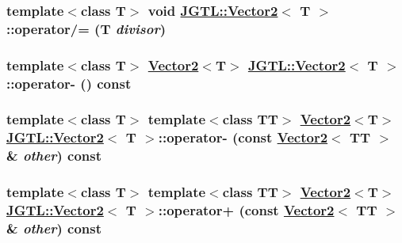\hypertarget{class_j_g_t_l_1_1_vector2_2cc09a9baa2ae84426f750ed2d50be0e}{
\subsubsection[operator/=]{\setlength{\rightskip}{0pt plus 5cm}template$<$class T$>$ void \hyperlink{class_j_g_t_l_1_1_vector2}{JGTL::Vector2}$<$ T $>$::operator/= (T {\em divisor})}}
\label{class_j_g_t_l_1_1_vector2_2cc09a9baa2ae84426f750ed2d50be0e}


\hypertarget{class_j_g_t_l_1_1_vector2_8be4baded91bfd4d18d26cc4b059b5ec}{
\subsubsection[operator-]{\setlength{\rightskip}{0pt plus 5cm}template$<$class T$>$ \hyperlink{class_j_g_t_l_1_1_vector2}{Vector2}$<$T$>$ \hyperlink{class_j_g_t_l_1_1_vector2}{JGTL::Vector2}$<$ T $>$::operator- () const}}
\label{class_j_g_t_l_1_1_vector2_8be4baded91bfd4d18d26cc4b059b5ec}


\hypertarget{class_j_g_t_l_1_1_vector2_536c37983214090d2b35a1bcbb98e564}{
\subsubsection[operator-]{\setlength{\rightskip}{0pt plus 5cm}template$<$class T$>$ template$<$class TT$>$ \hyperlink{class_j_g_t_l_1_1_vector2}{Vector2}$<$T$>$ \hyperlink{class_j_g_t_l_1_1_vector2}{JGTL::Vector2}$<$ T $>$::operator- (const \hyperlink{class_j_g_t_l_1_1_vector2}{Vector2}$<$ TT $>$ \& {\em other}) const}}
\label{class_j_g_t_l_1_1_vector2_536c37983214090d2b35a1bcbb98e564}


\hypertarget{class_j_g_t_l_1_1_vector2_6b48947227fbaad4190ea6240ff47400}{
\subsubsection[operator+]{\setlength{\rightskip}{0pt plus 5cm}template$<$class T$>$ template$<$class TT$>$ \hyperlink{class_j_g_t_l_1_1_vector2}{Vector2}$<$T$>$ \hyperlink{class_j_g_t_l_1_1_vector2}{JGTL::Vector2}$<$ T $>$::operator+ (const \hyperlink{class_j_g_t_l_1_1_vector2}{Vector2}$<$ TT $>$ \& {\em other}) const}}
\label{class_j_g_t_l_1_1_vector2_6b48947227fbaad4190ea6240ff47400}


